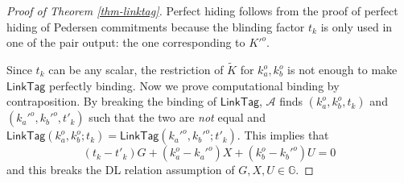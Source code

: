 \documentclass{article}
\theoremstyle{plain}
\theoremstyle{remark}
\begin{document}
\begin{proof}[Proof of Theorem \ref{thm-linktag}]
Perfect hiding follows from the proof of perfect hiding of Pedersen commitments because the blinding factor $t_k$ is only used in one of the pair output: the one corresponding to $K'^o$.

Since $t_k$ can be any scalar, the restriction of $\tilde{K}$ for $k_a^o, k_b^o$ is not enough to make $\textsf{LinkTag}$ perfectly binding. Now we prove computational binding by contraposition. By breaking the binding of $\textsf{LinkTag}$, $\mathcal{A}$ finds $(k_a^o, k_b^o, t_k)$ and $(k_a'^o, k_b'^o, t'_k)$ such that the two are \textit{not} equal and $\textsf{LinkTag}(k_a^o, k_b^o; t_k) = \textsf{LinkTag}(k_a'^o, k_b'^o; t'_k)$. This implies that
$$(t_k - t'_k) G + (k_a^o - k_a'^o) X + (k_b^o - k_b'^o) U = 0$$
and this breaks the DL relation assumption of $G, X, U \in \mathbb{G}$.
\end{proof}
\end{document}
